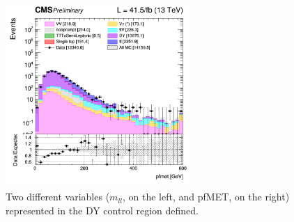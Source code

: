 \documentclass[a4paper, 10pt, openright]{report}
\begin{document}
\begin{figure}[htbp]
{\begin{minipage}[b]{.48\textwidth}
\end{minipage}\hfill
\begin{minipage}[b]{.48\textwidth}
\includegraphics[width=7cm, height=7cm]{figs/2017/log_cratio_dyCR_ll_METcorrected_pt.png}
\end{minipage} \hfill
}
\caption{Two different variables ($m_{ll}$, on the left, and pf\ac{MET}, on the right) represented in the \ac{DY} control region defined.}
\label{fig:DYCR2}
\end{figure}
\end{document}
